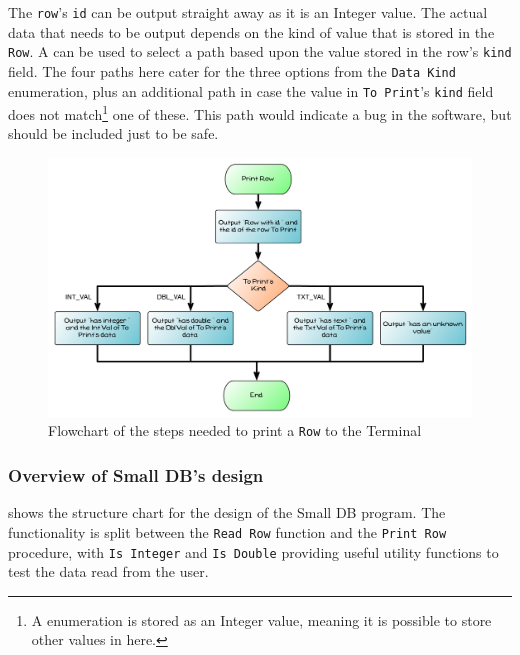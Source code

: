 The \texttt{row}'s \texttt{id} can be output straight away as it is an Integer value. The actual data that needs to be output depends on the kind of value that is stored in the \texttt{Row}. A  can be used to select a path based upon the value stored in the row's \texttt{kind} field. The four paths here cater for the three options from the \texttt{Data Kind} enumeration, plus an additional path in case the value in \texttt{To Print}'s \texttt{kind} field does not match\footnote{A enumeration is stored as an Integer value, meaning it is possible to store other values in here.} one of these. This path would indicate a bug in the software, but should be included just to be safe.

\begin{figure}[htbp]
   \centering
   \includegraphics[width=\textwidth]{./topics/type-decl/diagrams/PrintRowFlow} 
   \caption{Flowchart of the steps needed to print a \texttt{Row} to the Terminal}
   \label{fig:print-row-flow}
\end{figure}

\clearpage
\subsubsection{Overview of Small DB's design} %
\label{ssub:overview_of_small_db_s_design}

 shows the structure chart for the design of the Small DB program. The functionality is split between the \texttt{Read Row} function and the \texttt{Print Row} procedure, with \texttt{Is Integer} and \texttt{Is Double} providing useful utility functions to test the data read from the user.

